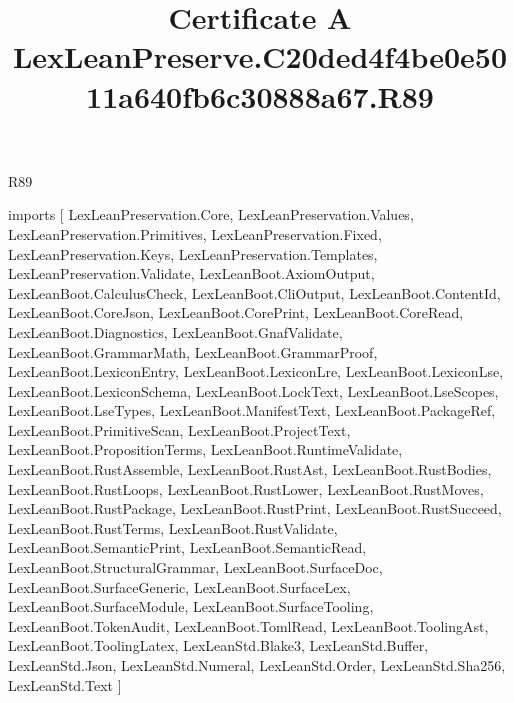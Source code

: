 \begin{lexlean}{R89}
\title{Certificate A LexLeanPreserve.C20ded4f4be0e5011a640fb6c30888a67.R89}
\begin{coremodule}
imports [
  LexLeanPreservation.Core,
  LexLeanPreservation.Values,
  LexLeanPreservation.Primitives,
  LexLeanPreservation.Fixed,
  LexLeanPreservation.Keys,
  LexLeanPreservation.Templates,
  LexLeanPreservation.Validate,
  LexLeanBoot.AxiomOutput,
  LexLeanBoot.CalculusCheck,
  LexLeanBoot.CliOutput,
  LexLeanBoot.ContentId,
  LexLeanBoot.CoreJson,
  LexLeanBoot.CorePrint,
  LexLeanBoot.CoreRead,
  LexLeanBoot.Diagnostics,
  LexLeanBoot.GnafValidate,
  LexLeanBoot.GrammarMath,
  LexLeanBoot.GrammarProof,
  LexLeanBoot.LexiconEntry,
  LexLeanBoot.LexiconLre,
  LexLeanBoot.LexiconLse,
  LexLeanBoot.LexiconSchema,
  LexLeanBoot.LockText,
  LexLeanBoot.LseScopes,
  LexLeanBoot.LseTypes,
  LexLeanBoot.ManifestText,
  LexLeanBoot.PackageRef,
  LexLeanBoot.PrimitiveScan,
  LexLeanBoot.ProjectText,
  LexLeanBoot.PropositionTerms,
  LexLeanBoot.RuntimeValidate,
  LexLeanBoot.RustAssemble,
  LexLeanBoot.RustAst,
  LexLeanBoot.RustBodies,
  LexLeanBoot.RustLoops,
  LexLeanBoot.RustLower,
  LexLeanBoot.RustMoves,
  LexLeanBoot.RustPackage,
  LexLeanBoot.RustPrint,
  LexLeanBoot.RustSucceed,
  LexLeanBoot.RustTerms,
  LexLeanBoot.RustValidate,
  LexLeanBoot.SemanticPrint,
  LexLeanBoot.SemanticRead,
  LexLeanBoot.StructuralGrammar,
  LexLeanBoot.SurfaceDoc,
  LexLeanBoot.SurfaceGeneric,
  LexLeanBoot.SurfaceLex,
  LexLeanBoot.SurfaceModule,
  LexLeanBoot.SurfaceTooling,
  LexLeanBoot.TokenAudit,
  LexLeanBoot.TomlRead,
  LexLeanBoot.ToolingAst,
  LexLeanBoot.ToolingLatex,
  LexLeanStd.Blake3,
  LexLeanStd.Buffer,
  LexLeanStd.Json,
  LexLeanStd.Numeral,
  LexLeanStd.Order,
  LexLeanStd.Sha256,
  LexLeanStd.Text
]


\end{coremodule}
\end{lexlean}
